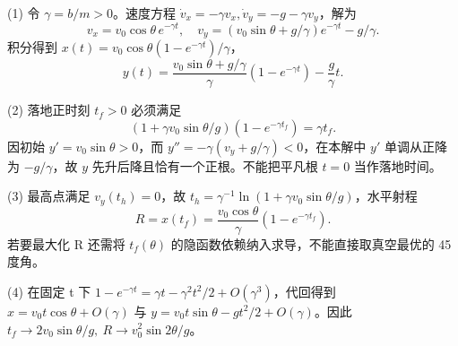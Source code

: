 (1) 令 \(\gamma=b/m>0\)。速度方程 \(\dot v_x=-\gamma v_x,\dot v_y=-g-\gamma v_y\)，解为
\[
v_x=v_0\cos\theta\,e^{-\gamma t},\quad
v_y=(v_0\sin\theta+g/\gamma)e^{-\gamma t}-g/\gamma.
\]
积分得到 \(x(t)=v_0\cos\theta(1-e^{-\gamma t})/\gamma\)，
\[
y(t)=\frac{v_0\sin\theta+g/\gamma}{\gamma}(1-e^{-\gamma t})-\frac g\gamma t.
\]

(2) 落地正时刻 \(t_f>0\) 必须满足
\[
(1+\gamma v_0\sin\theta/g)(1-e^{-\gamma t_f})=\gamma t_f.
\]
因初始 \(y'=v_0\sin\theta>0\)，而 \(y''=-\gamma(v_y+g/\gamma)<0\)，在本解中 \(y'\) 单调从正降为 \(-g/\gamma\)，故 \(y\) 先升后降且恰有一个正根。不能把平凡根 \(t=0\) 当作落地时间。

(3) 最高点满足 \(v_y(t_h)=0\)，故 \(t_h=\gamma^{-1}\ln(1+\gamma v_0\sin\theta/g)\)，水平射程
\[
R=x(t_f)=\frac{v_0\cos\theta}{\gamma}(1-e^{-\gamma t_f}).
\]
若要最大化 R 还需将 \(t_f(\theta)\) 的隐函数依赖纳入求导，不能直接取真空最优的 45 度角。

(4) 在固定 t 下 \(1-e^{-\gamma t}=\gamma t-\gamma^2t^2/2+O(\gamma^3)\)，代回得到 \(x=v_0t\cos\theta+O(\gamma)\) 与 \(y=v_0t\sin\theta-gt^2/2+O(\gamma)\)。因此 \(t_f\to2v_0\sin\theta/g,\ R\to v_0^2\sin2\theta/g\)。
